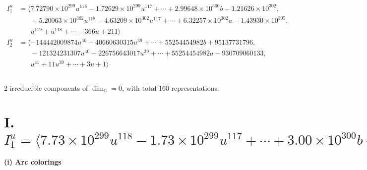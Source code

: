 \documentclass[1p]{elsarticle_modified}
\theoremstyle{definition}
\begin{document}
\begin{align*}
I^u_{1}&=\langle 
7.72790\times10^{299} u^{118}-1.72629\times10^{299} u^{117}+\cdots+2.99648\times10^{300} b-1.21626\times10^{302},\\
\phantom{I^u_{1}}&\phantom{= \langle  }-5.20063\times10^{302} u^{118}-4.63209\times10^{302} u^{117}+\cdots+6.32257\times10^{302} a-1.43930\times10^{305},\\
\phantom{I^u_{1}}&\phantom{= \langle  }u^{119}+u^{118}+\cdots-366 u+211\rangle \\
I^u_{2}&=\langle 
-144442009874 u^{40}-40660630315 u^{39}+\cdots+55254454982 b+95137731796,\\
\phantom{I^u_{2}}&\phantom{= \langle  }-121324231307 u^{40}-226756643017 u^{39}+\cdots+55254454982 a-930709060133,\\
\phantom{I^u_{2}}&\phantom{= \langle  }u^{41}+11 u^{39}+\cdots+3 u+1\rangle \\
\\
\end{align*}
\raggedright * 2 irreducible components of $\dim_{\mathbb{C}}=0$, with total 160 representations.\\
\newpage
\renewcommand{\arraystretch}{1}
\centering \section*{I. $I^u_{1}= \langle 7.73\times10^{299} u^{118}-1.73\times10^{299} u^{117}+\cdots+3.00\times10^{300} b-1.22\times10^{302},\;-5.20\times10^{302} u^{118}-4.63\times10^{302} u^{117}+\cdots+6.32\times10^{302} a-1.44\times10^{305},\;u^{119}+u^{118}+\cdots-366 u+211 \rangle$}
\flushleft \textbf{(i) Arc colorings}\\
\end{document}

